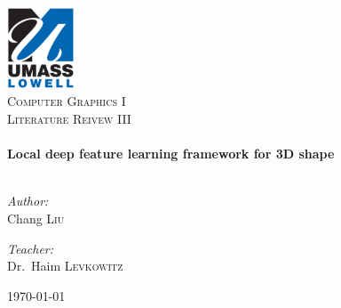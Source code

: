 \begin{titlepage}

\begin{center}


\includegraphics[width=0.15\textwidth]{./uml_logo}\\[5cm]    

\textsc{\LARGE Computer Graphics I}\\[1.5cm]

\textsc{\Large Literature Reivew III}\\[0.5cm]


\HRule \\[0.4cm]
{ \huge \bfseries Local deep feature learning framework for 3D shape}\\[0.4cm]

\HRule \\[1.5cm]

\begin{minipage}{0.4\textwidth}
\begin{flushleft} \large
\emph{Author:}\\
Chang \textsc{Liu}
\end{flushleft}
\end{minipage}
\begin{minipage}{0.4\textwidth}
\begin{flushright} \large
\emph{Teacher:} \\
Dr.~Haim \textsc{Levkowitz}
\end{flushright}
\end{minipage}

\vfill

{\large \today}

\end{center}

\end{titlepage}